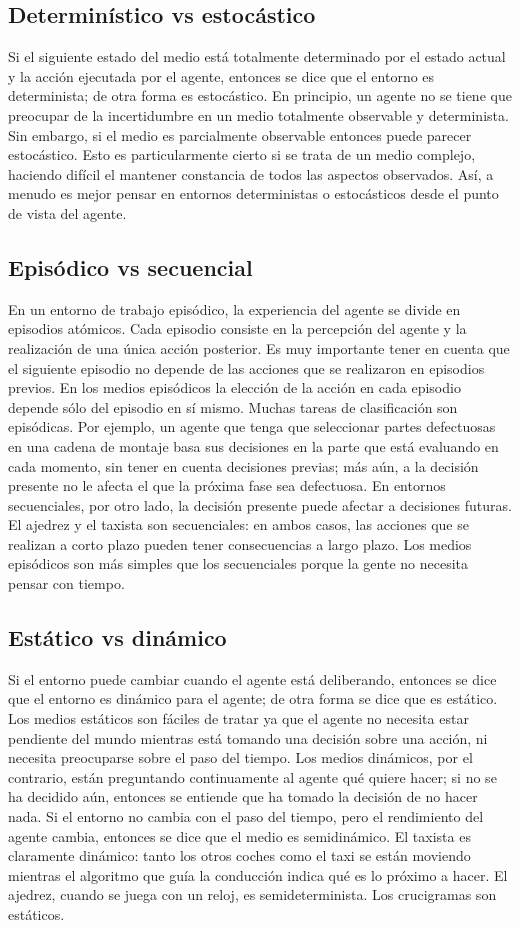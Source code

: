 \documentclass[12pt,a4paper]{report}
\begin{document}
\subsection*{Determinístico vs estocástico}
Si el siguiente estado del medio está totalmente determinado por el estado actual y la acción ejecutada por el agente, entonces se dice que el entorno es determinista; de otra forma es estocástico. En principio, un agente no se tiene que preocupar de la incertidumbre en un medio totalmente observable y determinista. Sin embargo, si el medio es parcialmente observable entonces puede parecer estocástico. Esto es particularmente cierto si se trata de un medio complejo, haciendo difícil el mantener constancia de todos las aspectos observados. Así, a menudo es mejor pensar en entornos deterministas o estocásticos desde el punto de vista del agente.
\subsection*{Episódico vs secuencial}
En un entorno de trabajo episódico, la experiencia del agente se divide en episodios atómicos. Cada episodio consiste en la percepción del agente y la realización de una única acción posterior. Es muy importante tener en cuenta que el siguiente episodio no depende de las acciones que se realizaron en episodios previos. En los medios episódicos la elección de la acción en cada episodio depende sólo del episodio en sí mismo. Muchas tareas de clasificación son episódicas. Por ejemplo, un agente que tenga que seleccionar partes defectuosas en una cadena de montaje basa sus decisiones en la parte que está evaluando en cada momento, sin tener en cuenta decisiones previas; más aún, a la decisión presente no le afecta el que la próxima fase sea defectuosa. En entornos secuenciales, por otro lado, la decisión presente puede afectar a decisiones futuras. El ajedrez y el taxista son secuenciales: en ambos casos, las acciones que se realizan a corto plazo pueden tener consecuencias a largo plazo. Los medios episódicos son más simples que los secuenciales porque la gente no necesita pensar con tiempo.
\subsection*{Estático vs dinámico}
Si el entorno puede cambiar cuando el agente está deliberando, entonces se dice que el entorno es dinámico para el agente; de otra forma se dice que es estático. Los medios estáticos son fáciles de tratar ya que el agente no necesita estar pendiente del mundo mientras está tomando una decisión sobre una acción, ni necesita preocuparse sobre el paso del tiempo. Los medios dinámicos, por el contrario, están preguntando continuamente al agente qué quiere hacer; si no se ha decidido aún, entonces se entiende que ha tomado la decisión de no hacer nada. Si el entorno no cambia con el paso del tiempo, pero el rendimiento del agente cambia, entonces se dice que el medio es semidinámico. El taxista es claramente dinámico: tanto los otros coches como el taxi se están moviendo mientras el algoritmo que guía la conducción indica qué es lo próximo a hacer. El ajedrez, cuando se juega con un reloj, es semideterminista. Los crucigramas son estáticos.
\end{document}
